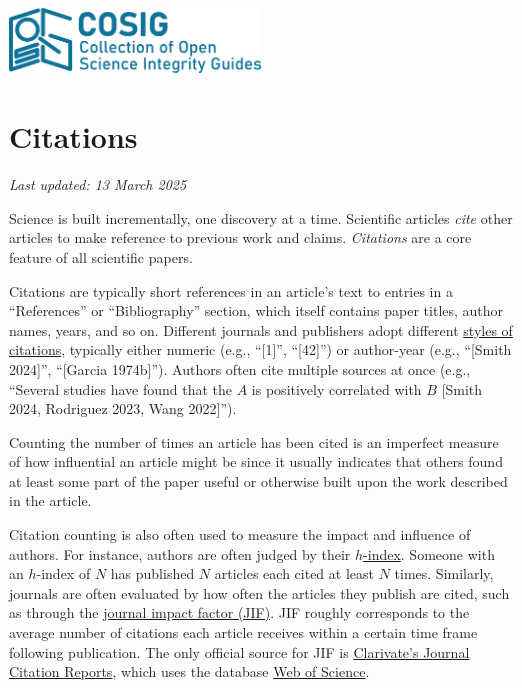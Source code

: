 \documentclass[letterpaper, 12pt]{article}
\begin{document}
\flushleft
\includegraphics[width=0.5\textwidth]{img/home/241017_final_logo_mockup.png}

\section*{Citations}
\textit{Last updated: 13 March 2025}

Science is built incrementally, one discovery at a time.
Scientific articles \emph{cite} other articles to make reference to previous work and claims.
\emph{Citations} are a core feature of all scientific papers.

Citations are typically short references in an article's text to entries in a ``References'' or ``Bibliography'' section,
which itself contains paper titles, author names, years, and so on.
Different journals and publishers adopt different \href{https://libguides.brown.edu/citations/styles}{styles of citations}, typically either numeric (e.g., ``[1]'', ``[42]'')
or author-year (e.g., ``[Smith 2024]'', ``[Garcia 1974b]''). Authors often cite multiple sources at once (e.g., ``Several studies have found that the $A$ is positively correlated with $B$ [Smith 2024, Rodriguez 2023, Wang 2022]'').

Counting the number of times an article has been cited is an imperfect measure of how influential an article might be since it usually indicates that others found at least some part of the paper useful or otherwise built upon the work described in the article.

Citation counting is also often used to measure the impact and influence of authors. For instance, authors are often judged by their \href{https://doi.org/10.1073%2Fpnas.0507655102}{$h$-index}.
Someone with an $h$-index of $N$ has published $N$ articles each cited at least $N$ times. Similarly, journals are often evaluated by how often the articles they publish are cited, such as through the \href{https://doi.org/10.1001%2Fjama.295.1.90}{journal impact factor (JIF)}. JIF roughly corresponds to the average number of citations each article receives within a certain time frame following publication. The only official source for JIF is \href{https://clarivate.com/academia-government/scientific-and-academic-research/research-funding-analytics/journal-citation-reports/}{Clarivate's Journal Citation Reports}, which uses the database \href{https://clarivate.com/academia-government/scientific-and-academic-research/research-discovery-and-referencing/web-of-science/}{Web of Science}.
\end{document}
